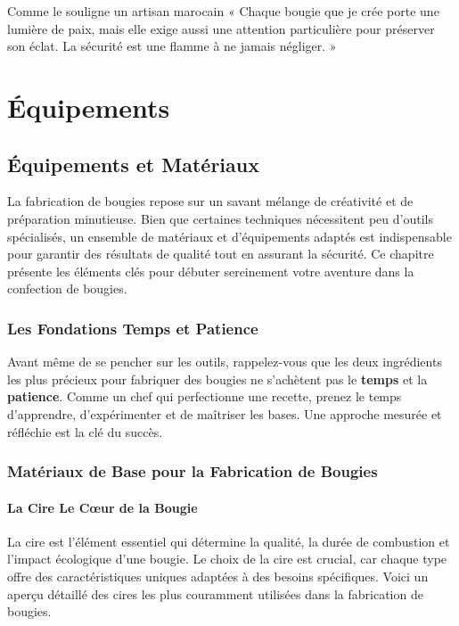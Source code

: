 \documentclass[11pt,fleqn,onecolumn,oneside]{book}
\begin{document}
\begin{example}
Comme le souligne un artisan marocain « Chaque bougie que je crée porte une lumière de paix, mais elle exige aussi une attention particulière pour préserver son éclat. La sécurité est une flamme à ne jamais négliger. »
\end{example}



\part*{Équipements}
\chapter{Équipements et Matériaux}

\begin{definition}
La fabrication de bougies repose sur un savant mélange de créativité et de préparation minutieuse. Bien que certaines techniques nécessitent peu d’outils spécialisés, un ensemble de matériaux et d’équipements adaptés est indispensable pour garantir des résultats de qualité tout en assurant la sécurité. Ce chapitre présente les éléments clés pour débuter sereinement votre aventure dans la confection de bougies.
\end{definition}

\section{Les Fondations Temps et Patience}

Avant même de se pencher sur les outils, rappelez-vous que les deux ingrédients les plus précieux pour fabriquer des bougies ne s’achètent pas le \textbf{temps} et la \textbf{patience}. Comme un chef qui perfectionne une recette, prenez le temps d’apprendre, d’expérimenter et de maîtriser les bases. Une approche mesurée et réfléchie est la clé du succès.

\section{Matériaux de Base pour la Fabrication de Bougies}

\subsection*{La Cire Le Cœur de la Bougie}

\begin{definition}
La cire est l’élément essentiel qui détermine la qualité, la durée de combustion et l’impact écologique d’une bougie. Le choix de la cire est crucial, car chaque type offre des caractéristiques uniques adaptées à des besoins spécifiques. Voici un aperçu détaillé des cires les plus couramment utilisées dans la fabrication de bougies.
\end{definition}
\end{document}
